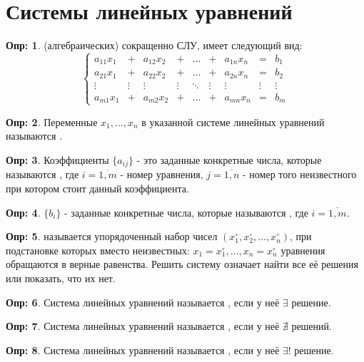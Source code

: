 \documentclass[12pt]{article}
\theoremstyle{definition}
\newtheorem{defn}{Опр:}
\begin{document}
\section*{Системы линейных уравнений}
\begin{defn}
	 (алгебраических) сокращенно СЛУ, имеет следующий вид:
	$$
		\left\{
		\begin{array}{ccccccccc}
			 a_{11} x_1 & +& a_{12}x_2 &+& \dotsc &+& a_{1n} x_n  & = & b_1 \\
			 a_{21} x_1 &+& a_{22}x_2 &+& \dotsc &+& a_{2n} x_n & = & b_2\\
			 \vdots & \vdots & \vdots & \vdots & \ddots & \vdots &\vdots & \vdots & \vdots  \\
			 a_{m1}x_1 &+& a_{m2}x_2 &+& \dotsc &+&  a_{mn}x_n & = & b_m
		\end{array}
		\right.
	$$
\end{defn}
\begin{defn}
	Переменные $x_1, \dotsc, x_n$ в указанной системе линейных уравнений называются .
\end{defn}
\begin{defn}
	Коэффициенты $\{a_{ij}\}$ - это заданные конкретные числа, которые называются , где $i = \overline{1,m}$ - номер уравнения, $j = \overline{1,n}$ - номер того неизвестного при котором стоит данный коэффициента. 
\end{defn}	
\begin{defn}	 
	 $\{b_i\}$ - заданные конкретные числа, которые называются , где $i = \overline{1,m}$.
\end{defn}
\begin{defn}
	 называется упорядоченный набор чисел $(x_1^\circ, x_2^\circ, \dotsc, x_n^\circ)$, при подстановке которых вместо неизвестных: $x_1 = x_1^\circ, \dotsc, x_n = x_n^\circ$ уравнения обращаются в верные равенства. Решить систему означает найти все её решения или показать, что их нет.
\end{defn}
\begin{defn}
	Система линейных уравнений называется , если у неё $\exists$ решение.
\end{defn}
\begin{defn}
	Система линейных уравнений называется , если у неё $\nexists$ решений.
\end{defn}
\begin{defn}
	Система линейных уравнений называется , если у неё $\exists!$ решение.
\end{defn}
\end{document}
